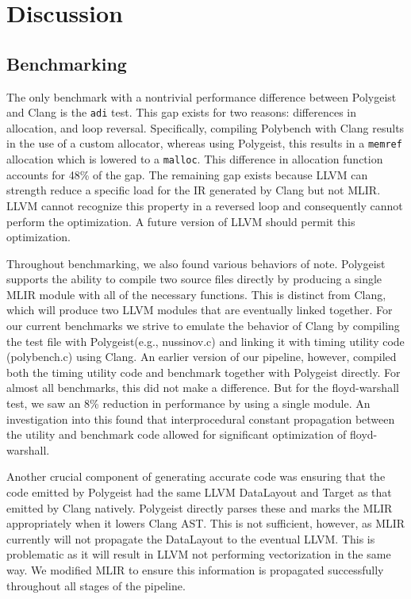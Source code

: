 \documentclass[sigplan]{acmart}
\newcommand{\icode}[1]{{\texttt {#1}}}
\newcommand{\tool}{Polygeist\xspace}
\newcommand{\memref}{\icode{memref}\xspace}
\begin{document}
\section{Discussion}
\subsection{Benchmarking}
\label{sec:benchmarking}
The only benchmark with a nontrivial performance difference between \tool and Clang is the \icode{adi} test. This gap exists for two reasons: differences in allocation, and loop reversal. Specifically, compiling Polybench with Clang results in the use of a custom allocator, whereas using \tool, this results in a \memref allocation which is lowered to a \icode{malloc}. This difference in allocation function accounts for 48\% of the gap. The remaining gap exists because LLVM can strength reduce a specific load for the IR generated by Clang but not MLIR. LLVM cannot recognize this property in a reversed loop and consequently cannot perform the optimization. A future version of LLVM should permit this optimization. 

Throughout benchmarking, we also found various behaviors of note. \tool supports the ability to compile two source files directly by producing a single MLIR module with all of the necessary functions. This is distinct from Clang, which will produce two LLVM modules that are eventually linked together. For our current benchmarks we strive to emulate the behavior of Clang by compiling the test file with \tool (e.g., nussinov.c) and linking it with timing utility code (polybench.c) using Clang. An earlier version of our pipeline, however, compiled both the timing utility code and benchmark together with \tool directly. For almost all benchmarks, this did not make a difference. But for the floyd-warshall test, we saw an 8\% reduction in performance by using a single module. An investigation into this found that interprocedural constant propagation between the utility and benchmark code allowed for significant optimization of floyd-warshall.

Another crucial component of generating accurate code was ensuring that the code emitted by \tool had the same LLVM DataLayout and Target as that emitted by Clang natively. \tool directly parses these and marks the MLIR appropriately when it lowers Clang AST. This is not sufficient, however, as MLIR currently will not propagate the DataLayout to the eventual LLVM. This is problematic as it will result in LLVM not performing vectorization in the same way. We modified MLIR to ensure this information is propagated successfully throughout all stages of the pipeline.
\end{document}
